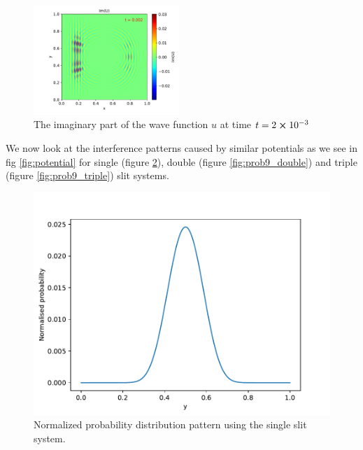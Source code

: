 \documentclass[english,notitlepage,reprint,nofootinbib]{revtex4-2}  %
\begin{document}
	\begin{figure}[H]
		\centering
		\includegraphics[width=0.49\textwidth]{figures/problem8_U_Im_0.002.pdf}
		\caption{The imaginary part of the wave function $u$ at time $t = 2\cross10^{-3}$}
		\label{fig:prob8_Im2}
	\end{figure}

	We now look at the  interference patterns caused by similar potentials as we see in fig \ref{fig:potential} for single (figure \ref{fig:prob9_single}), double (figure \ref{fig:prob9_double}) and triple (figure \ref{fig:prob9_triple}) slit systems.
	\begin{figure}[h!]
		\centering
		\includegraphics[scale=0.55]{figures/problem9_single_slit.pdf}
		\caption{Normalized probability distribution pattern using the single slit system.}
		\label{fig:prob9_single}
	\end{figure}
	
\end{document}
